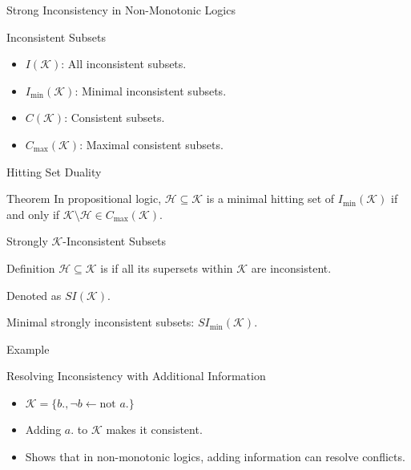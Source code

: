 \begin{frame}{Strong Inconsistency in Non-Monotonic Logics}
    \begin{block}{Inconsistent Subsets}
        \begin{itemize}
            \item $I(\mathcal{K})$: All inconsistent subsets.
            \item $I_{\min}(\mathcal{K})$: Minimal inconsistent subsets.
            \item $C(\mathcal{K})$: Consistent subsets.
            \item $C_{\max}(\mathcal{K})$: Maximal consistent subsets.
        \end{itemize}
    \end{block}
\end{frame}

\begin{frame}{Hitting Set Duality}
    \begin{block}{Theorem}
        In propositional logic, $\mathcal{H} \subseteq \mathcal{K}$ is a minimal hitting set of $I_{\min}(\mathcal{K})$ if and only if $\mathcal{K} \setminus \mathcal{H} \in C_{\max}(\mathcal{K})$.
    \end{block}
\end{frame}

\begin{frame}{Strongly $\mathcal{K}$-Inconsistent Subsets}
    \begin{block}{Definition}
        $\mathcal{H} \subseteq \mathcal{K}$ is  if all its supersets within $\mathcal{K}$ are inconsistent.

        Denoted as $SI(\mathcal{K})$.

        Minimal strongly inconsistent subsets: $SI_{\min}(\mathcal{K})$.
    \end{block}
\end{frame}

\begin{frame}{Example}
    \begin{exampleblock}{Resolving Inconsistency with Additional Information}
        \begin{itemize}
            \item $\mathcal{K} = \{b., \neg b \leftarrow \text{not } a.\}$
            \item Adding $a.$ to $\mathcal{K}$ makes it consistent.
            \item Shows that in non-monotonic logics, adding information can resolve conflicts.
        \end{itemize}
    \end{exampleblock}
\end{frame}

